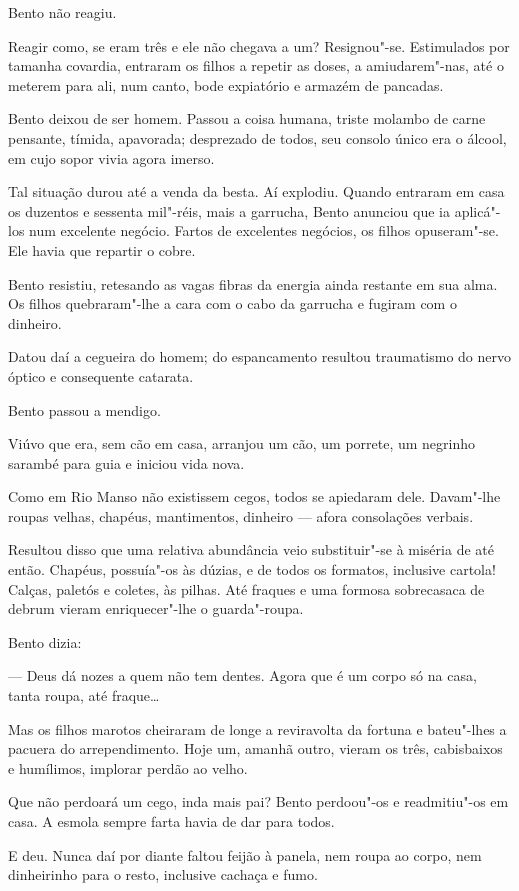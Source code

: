 Bento não reagiu.

Reagir como, se eram três e ele não chegava a um? Resignou"-se.
Estimulados por tamanha covardia, entraram os filhos a repetir as doses,
a amiudarem"-nas, até o meterem para ali, num canto, bode expiatório e
armazém de pancadas.

Bento deixou de ser homem. Passou a coisa humana, triste molambo de
carne pensante, tímida, apavorada; desprezado de todos, seu consolo
único era o álcool, em cujo sopor vivia agora imerso.

Tal situação durou até a venda da besta. Aí explodiu. Quando entraram em
casa os duzentos e sessenta mil"-réis, mais a garrucha, Bento anunciou
que ia aplicá"-los num excelente negócio. Fartos de excelentes negócios,
os filhos opuseram"-se. Ele havia que repartir o cobre.

Bento resistiu, retesando as vagas fibras da energia ainda restante em
sua alma. Os filhos quebraram"-lhe a cara com o cabo da garrucha e
fugiram com o dinheiro.

Datou daí a cegueira do homem; do espancamento resultou traumatismo do
nervo óptico e consequente catarata.

Bento passou a mendigo.

Viúvo que era, sem cão em casa, arranjou um cão, um porrete, um negrinho
sarambé para guia e iniciou vida nova.

Como em Rio Manso não existissem cegos, todos se apiedaram dele.
Davam"-lhe roupas velhas, chapéus, mantimentos, dinheiro --- afora
consolações verbais.

Resultou disso que uma relativa abundância veio substituir"-se à miséria
de até então. Chapéus, possuía"-os às dúzias, e de todos os formatos,
inclusive cartola! Calças, paletós e coletes, às pilhas. Até fraques e
uma formosa sobrecasaca de debrum vieram enriquecer"-lhe o guarda"-roupa.

Bento dizia:

--- Deus dá nozes a quem não tem dentes. Agora que é um corpo só na
casa, tanta roupa, até fraque\ldots{}

Mas os filhos marotos cheiraram de longe a reviravolta da fortuna e
bateu"-lhes a pacuera do arrependimento. Hoje um, amanhã outro, vieram os
três, cabisbaixos e humílimos, implorar perdão ao velho.

Que não perdoará um cego, inda mais pai? Bento perdoou"-os e readmitiu"-os
em casa. A esmola sempre farta havia de dar para todos.

E deu. Nunca daí por diante faltou feijão à panela, nem roupa ao corpo,
nem dinheirinho para o resto, inclusive cachaça e fumo.

